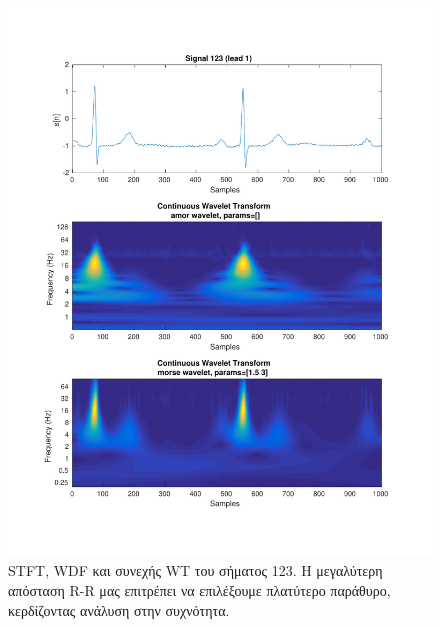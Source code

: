 \documentclass[11pt,a4paper]{article}
\begin{document}
\begin{figure}[H]
\begin{minipage}{0.48\textwidth}
	\includegraphics[width=\textwidth]{fig/123l1_cwt.pdf}
\end{minipage}
\vfill
\caption{STFT, WDF και συνεχής WT του σήματος 123. Η μεγαλύτερη απόσταση R-R μας επιτρέπει να επιλέξουμε πλατύτερο παράθυρο, κερδίζοντας ανάλυση στην συχνότητα.}
\label{fig:123l1_stft_wdf_wt}
\end{figure}
\end{document}
